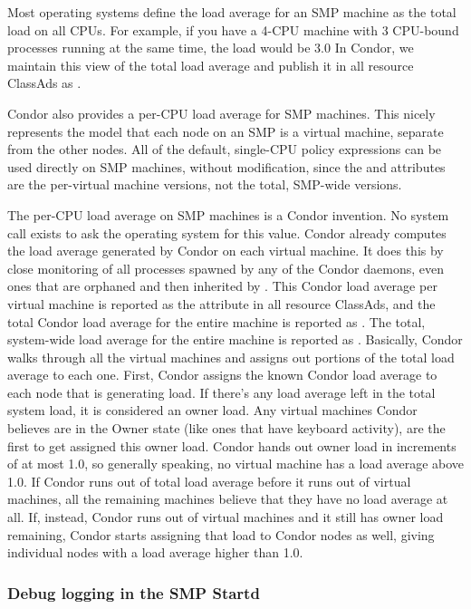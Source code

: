 Most operating systems define the load average for an SMP machine as
the total load on all CPUs.
For example, if you have a 4-CPU machine with 3 CPU-bound processes
running at the same time, the load would be 3.0
In Condor, we maintain this view of the total load average and publish
it in all resource ClassAds as .

Condor also provides a per-CPU load average for SMP machines.
This nicely represents the model that each node on an SMP is a virtual machine,
separate from the other nodes.
All of the default, single-CPU policy expressions can be used directly
on SMP machines, without modification, since the  and
 attributes are the per-virtual machine versions,
not the total, SMP-wide versions.

The per-CPU load average on SMP machines is a Condor invention. 
No system call exists to ask the operating system for this value.
Condor already computes the load average generated by Condor on each
virtual machine.
It does this by close monitoring of all processes spawned by any of the
Condor daemons, even ones that are orphaned and then inherited by
. 
This Condor load average per virtual machine is reported as
the attribute
 in all resource ClassAds, and the total Condor
load average for the entire machine is reported as
. 
The total, system-wide load average for the entire
machine  is reported as .
Basically, Condor walks through all the virtual machines and assigns out
portions of the total load average to each one. 
First, Condor assigns the known Condor load average to each node that
is generating load.  
If there's any load average left in the total system load, it is
considered an owner load.
Any virtual machines Condor believes are in the Owner state (like
ones that have keyboard activity), are the first to get assigned
this owner load.
Condor hands out owner load in increments of at most 1.0, so generally
speaking, no virtual machine has a load average above 1.0.
If Condor runs out of total load average before it runs out of virtual
machines, all the remaining machines believe that they have no load average
at all.
If, instead, Condor runs out of virtual machines and it still has owner
load remaining, Condor starts assigning that load to Condor nodes as
well,
giving individual nodes with a load average higher than 1.0.


\subsubsection{\label{sec:SMP-logging}
Debug logging in the SMP Startd}

